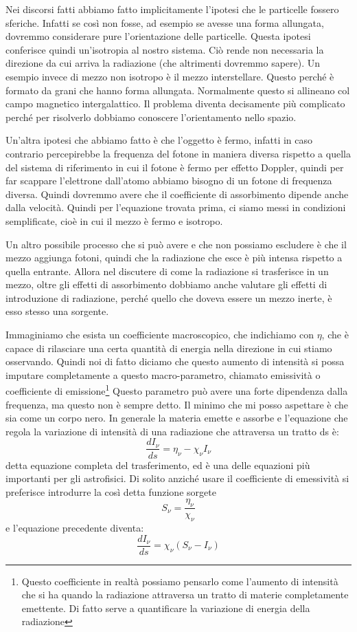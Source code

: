 \documentclass[a4paper,11pt]{article}
\begin{document}
    Nei discorsi fatti abbiamo fatto implicitamente l'ipotesi che le particelle fossero sferiche. Infatti se così non fosse, ad esempio se avesse una forma allungata, dovremmo considerare pure l'orientazione delle particelle. Questa ipotesi conferisce quindi un'isotropia al nostro sistema. Ciò rende non necessaria la direzione da cui arriva la radiazione (che altrimenti dovremmo sapere). Un esempio invece di mezzo non isotropo è il mezzo interstellare. Questo perché è formato da grani che hanno forma allungata. Normalmente questo si allineano col campo magnetico intergalattico. Il problema diventa decisamente più complicato perché per risolverlo dobbiamo conoscere l'orientamento nello spazio.
    
    Un'altra ipotesi che abbiamo fatto è che l'oggetto è fermo, infatti in caso contrario percepirebbe la frequenza del fotone in maniera diversa rispetto a quella del sistema di riferimento in cui il fotone è fermo per effetto Doppler, quindi per far scappare l'elettrone dall'atomo abbiamo bisogno di un fotone di frequenza diversa. Quindi dovremmo avere che il coefficiente di assorbimento dipende anche dalla velocità. Quindi per l'equazione trovata prima, ci siamo messi in condizioni semplificate, cioè in cui il mezzo è fermo e isotropo.
    
    Un altro possibile processo che si può avere e che non possiamo escludere è che il mezzo aggiunga fotoni, quindi che la radiazione che esce è più intensa rispetto a quella entrante. Allora nel discutere di come la radiazione si trasferisce in un mezzo, oltre gli effetti di assorbimento dobbiamo anche valutare gli effetti di introduzione di radiazione, perché quello che doveva essere un mezzo inerte, è esso stesso una sorgente. 
    
    Immaginiamo che esista un coefficiente macroscopico, che indichiamo con $\eta$, che è capace di rilasciare una certa quantità di energia nella direzione in cui stiamo osservando. Quindi noi di fatto diciamo che questo aumento di intensità si possa imputare completamente a questo macro-parametro, chiamato emissività o coefficiente di emissione\footnote{Questo coefficiente in realtà possiamo pensarlo come l'aumento di intensità che si ha quando la radiazione attraversa un tratto di materie completamente emettente. Di fatto serve a quantificare la variazione di energia della radiazione} Questo parametro può avere una forte dipendenza dalla frequenza, ma questo non è sempre detto. Il minimo che mi posso aspettare è che sia come un corpo nero. In generale la materia emette e assorbe e l'equazione che regola la variazione di intensità di una radiazione che attraversa un tratto ds è:
    $$
    \frac{dI_{\nu}}{ds} = \eta_{\nu} - \chi_{\nu} I_{\nu}
    $$
    detta equazione completa del trasferimento, ed è una delle equazioni più importanti per gli astrofisici.  Di solito anziché usare il coefficiente di emessività si preferisce introdurre la così detta funzione sorgete 
    $$
        S_\nu = \frac{ \eta_{\nu} }{ \chi_{\nu} }
    $$
    e l'equazione precedente diventa:
    $$
    \frac{dI_{\nu}}{ds} = \chi_{\nu} \left( S_\nu - I_{\nu} \right)
    $$
    
\end{document}
